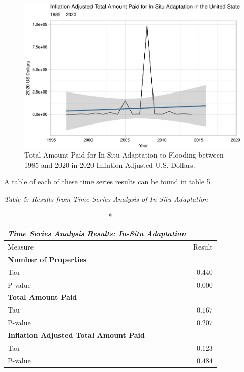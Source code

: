 \documentclass[
  12pt,
]{article}
\begin{document}
\begin{figure}
\centering
\includegraphics{finalreport_files/figure-latex/unnamed-chunk-22-1.pdf}
\caption{Total Amount Paid for In-Situ Adaptation to Flooding between
1985 and 2020 in 2020 Inflation Adjusted U.S. Dollars.}
\end{figure}

\newpage

A table of each of these time series results can be found in table 5.

\emph{Table 5: Results from Time Series Analysis of In-Situ
Adaptation}\\
\captionsetup[table]{labelformat=empty,skip=1pt}

\begin{longtable}{lr}
\caption*{
{\large \emph{\textbf{Time Series Analysis Results: In-Situ Adaptation}}}
} \\ 
\toprule
Measure & Result \\ 
\midrule
\multicolumn{1}{l}{\textbf{Number of Properties}} \\ 
\midrule
Tau & $0.440$ \\ 
P-value & $0.000$ \\ 
\midrule
\multicolumn{1}{l}{\textbf{Total Amount Paid}} \\ 
\midrule
Tau & $0.167$ \\ 
P-value & $0.207$ \\ 
\midrule
\multicolumn{1}{l}{\textbf{Inflation Adjusted Total Amount Paid}} \\ 
\midrule
Tau & $0.123$ \\ 
P-value & $0.484$ \\ 
\bottomrule
\end{longtable}
\end{document}

